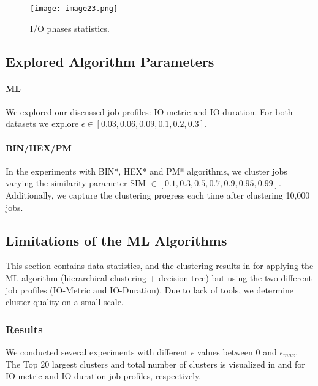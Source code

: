 \documentclass{jhps}
\begin{document}


\begin{figure}
  \centering
  \texttt{[image: image23.png]}
  \caption{I/O phases statistics.}
  \label{fig:phases_stats}
\end{figure}


\subsection{Explored Algorithm Parameters}
\paragraph{ML}
We explored our discussed job profiles: IO-metric and IO-duration.
For both datasets we explore $\epsilon \in [0.03, 0.06, 0.09, 0.1, 0.2, 0.3]$.

\paragraph{BIN/HEX/PM}
In the experiments with BIN*, HEX* and PM* algorithms, we cluster jobs varying the similarity parameter SIM $\in [0.1, 0.3, 0.5, 0.7, 0.9, 0.95, 0.99]$.
Additionally, we capture the clustering progress each time after clustering 10,000 jobs.


\subsection{Limitations of the ML Algorithms}
This section contains data statistics, and the clustering results in  for applying the ML algorithm (hierarchical clustering + decision tree) but using the two different job profiles (IO-Metric and IO-Duration).
Due to lack of tools, we determine cluster quality on a small scale.



\subsubsection{Results}
We conducted several experiments with different $\epsilon$ values between 0 and $\epsilon_{max}$.
The Top 20 largest clusters and total number of clusters is visualized in  and  for IO-metric and IO-duration job-profiles, respectively.
\end{document}

